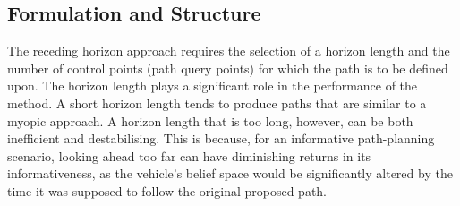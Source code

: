		
		\subsection{Formulation and Structure}
		\label{InformativeSeafloorExploration:RecedingHorizonFormulation:Structure}
		
			The receding horizon approach requires the selection of a horizon length and the number of control points (path query points) for which the path is to be defined upon. The horizon length plays a significant role in the performance of the method. A short horizon length tends to produce paths that are similar to a myopic approach. A horizon length that is too long, however, can be both inefficient and destabilising. This is because, for an informative path-planning scenario, looking ahead too far can have diminishing returns in its informativeness, as the vehicle's belief space would be significantly altered by the time it was supposed to follow the original proposed path.
	
